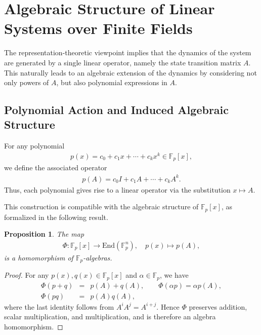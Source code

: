 \documentclass[letterpaper, 9pt, conference]{ieeeconf}
\newtheorem{proposition}[theorem]{Proposition}
\begin{document}
\section{Algebraic Structure of Linear Systems over Finite Fields}\label{sec_algebraic_structure}

The representation-theoretic viewpoint implies that the dynamics of the system
are generated by a single linear operator, namely the state transition matrix
$A$. This naturally leads to an algebraic extension of the dynamics by
considering not only powers of $A$, but also polynomial expressions in $A$.

\subsection{Polynomial Action and Induced Algebraic Structure}

For any polynomial
\begin{eqnarray}
p(x) = c_0 + c_1 x + \cdots + c_k x^k \in \mathbb{F}_p[x],
\end{eqnarray}
we define the associated operator
\begin{eqnarray}
p(A) = c_0 I + c_1 A + \cdots + c_k A^k.
\end{eqnarray}
Thus, each polynomial gives rise to a linear operator via the substitution
$x \mapsto A$.

This construction is compatible with the algebraic structure of
$\mathbb{F}_p[x]$, as formalized in the following result.

\begin{proposition}
The map
\begin{eqnarray}
\Phi : \mathbb{F}_p[x] \to \mathrm{End}(\mathbb{F}_p^n), \quad
p(x) \mapsto p(A),
\end{eqnarray}
is a homomorphism of $\mathbb{F}_p$-algebras.
\end{proposition}

\begin{proof}
For any $p(x), q(x) \in \mathbb{F}_p[x]$ and $\alpha \in \mathbb{F}_p$, we have
\begin{eqnarray*}
\Phi(p + q) &=& p(A) + q(A), \qquad \Phi(\alpha p) = \alpha p(A), \\
\Phi(pq) &=& p(A)q(A),
\end{eqnarray*}
where the last identity follows from $A^i A^j = A^{i+j}$. Hence $\Phi$
preserves addition, scalar multiplication, and multiplication, and is therefore
an algebra homomorphism.
\end{proof}
\end{document}
